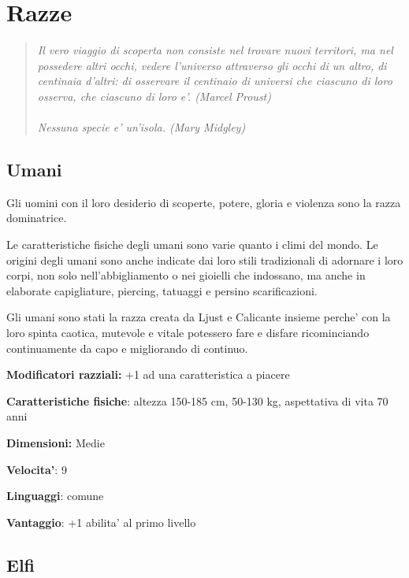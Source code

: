 \documentclass[a4paper,11pt,twoside,openany]{book}
\begin{document}
\pagebreak


\section{Razze}

\begin{quote}\textit{
Il vero viaggio di scoperta non consiste nel trovare nuovi territori, ma nel possedere altri occhi, vedere l'universo attraverso gli occhi di un altro, di centinaia d'altri: di osservare il centinaio di universi che ciascuno di loro osserva, che ciascuno di loro e'. (Marcel Proust)\\
\\
Nessuna specie e' un'isola. (Mary Midgley)
}\end{quote}

\subsection{Umani}

Gli uomini con il loro desiderio di scoperte, potere, gloria e violenza sono la razza dominatrice.

Le caratteristiche fisiche degli umani sono varie quanto i climi del mondo. Le origini degli umani sono anche indicate dai loro stili tradizionali di adornare i loro corpi, non solo nell'abbigliamento o nei gioielli che indossano, ma anche in elaborate capigliature, piercing, tatuaggi e persino scarificazioni.

Gli umani sono stati la razza creata da Ljust e Calicante insieme perche' con la loro spinta caotica, mutevole e vitale potessero fare e disfare ricominciando continuamente da capo e migliorando di continuo.

\textbf{Modificatori razziali:} +1 ad una caratteristica a piacere

\textbf{Caratteristiche fisiche}: altezza 150-185 cm, 50-130 kg, aspettativa di vita 70 anni

\textbf{Dimensioni:} Medie

\textbf{Velocita'}: 9

\textbf{Linguaggi}: comune

\textbf{Vantaggio}: +1 abilita' al primo livello

\subsection{Elfi}

\label{elfi}
\end{document}
